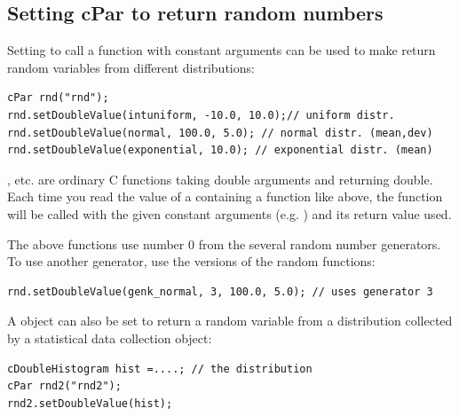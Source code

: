 \subsection{Setting cPar to return random numbers}

Setting  to call a function with constant arguments can
be used to make  return random variables
from different distributions:

\begin{verbatim}
cPar rnd("rnd");
rnd.setDoubleValue(intuniform, -10.0, 10.0);// uniform distr.
rnd.setDoubleValue(normal, 100.0, 5.0); // normal distr. (mean,dev)
rnd.setDoubleValue(exponential, 10.0); // exponential distr. (mean)
\end{verbatim}

,  etc. are ordinary C functions
taking double arguments and returning double. Each time you read the
value of a  containing a function like above, the
function will be called with the given constant arguments (e.g.
) and its return value used.

The above functions use number 0 from the several random number
generators. To use another generator, use the  versions
of the random functions:

\begin{verbatim}
rnd.setDoubleValue(genk_normal, 3, 100.0, 5.0); // uses generator 3
\end{verbatim}

A  object can also be set to return a random variable from
a distribution collected by a statistical data collection object:

\begin{verbatim}
cDoubleHistogram hist =....; // the distribution
cPar rnd2("rnd2");
rnd2.setDoubleValue(hist);
\end{verbatim}


%
%
%

